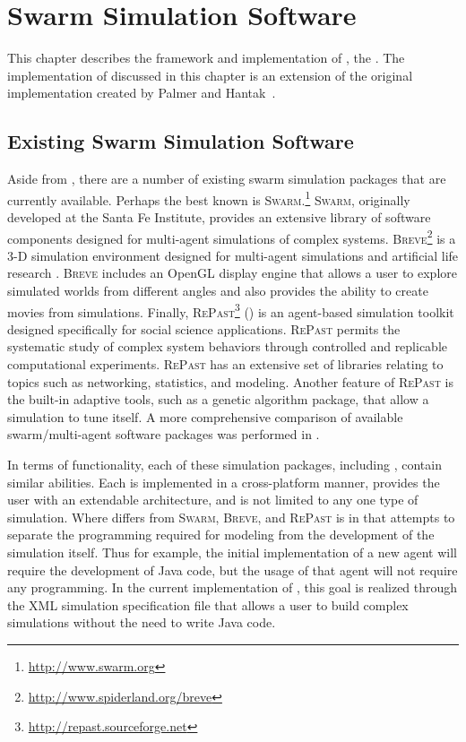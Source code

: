 \chapter{Swarm Simulation Software}
\label{ch:SwarmSimulationSoftware}

This chapter describes the framework and implementation of \SWEEP{}, the \SWEEPexp{}.  The implementation of \SWEEP{} discussed in this chapter is an extension of the original \SWEEP{} implementation created by Palmer and Hantak~\cite{hantak:SWEEP}. 

\section{Existing Swarm Simulation Software}

Aside from \SWEEP, there are a number of existing swarm simulation packages that are currently available.
Perhaps the best known is \textsc{Swarm}.\footnote{\url{http://www.swarm.org}}  \textsc{Swarm}, originally developed at the Santa Fe Institute, provides an extensive library of software components designed for multi-agent simulations of complex systems.
\textsc{Breve}\footnote{\url{http://www.spiderland.org/breve}} is a 3-D simulation environment designed for multi-agent simulations and artificial life research .  \textsc{Breve} includes an OpenGL display engine that allows a user to explore simulated worlds from different angles and also provides the ability to create movies from simulations.  
Finally, \textsc{RePast}\footnote{\url{http://repast.sourceforge.net}} () is an agent-based simulation toolkit designed specifically for social science applications.  \textsc{RePast} permits the systematic study of complex system behaviors through controlled and replicable computational experiments.  \textsc{RePast} has an extensive set of libraries relating to topics such as networking, statistics, and modeling.  Another feature of \textsc{RePast} is the built-in adaptive tools, such as a genetic algorithm package, that allow a simulation to tune itself.  A more comprehensive comparison of available swarm/multi-agent software packages was performed in \cite{rtobias:SwarmSoftware}.

In terms of functionality, each of these simulation packages, including \SWEEP, contain similar abilities.  Each is implemented in a cross-platform manner, provides the user with an extendable architecture, and is not limited to any one type of simulation.  Where \SWEEP differs from \textsc{Swarm}, \textsc{Breve}, and \textsc{RePast} is in that \SWEEP attempts to separate the programming required for modeling from the development of the simulation itself.  Thus for example, the initial implementation of a new agent will require the development of Java code, but the usage of that agent will not require any programming.  In the current implementation of \SWEEP, this goal is realized through the XML simulation specification file that allows a user to build complex simulations without the need to write Java code.

